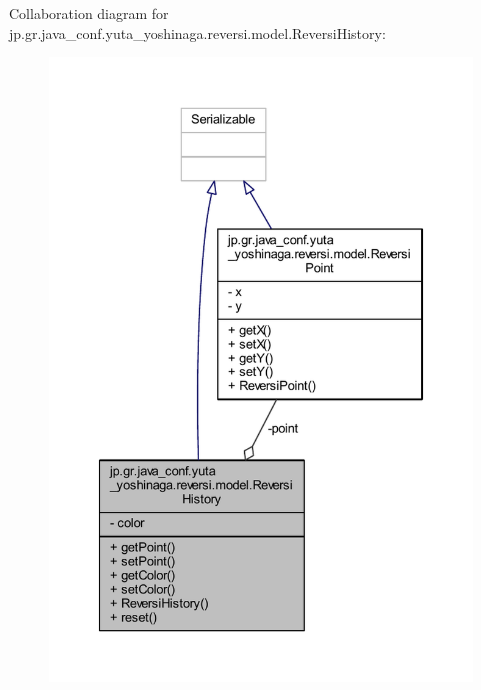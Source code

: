 Collaboration diagram for jp.\+gr.\+java\+\_\+conf.\+yuta\+\_\+yoshinaga.\+reversi.\+model.\+Reversi\+History\+:
\nopagebreak
\begin{figure}[H]
\begin{center}
\leavevmode
\includegraphics[width=334pt]{classjp_1_1gr_1_1java__conf_1_1yuta__yoshinaga_1_1reversi_1_1model_1_1_reversi_history__coll__graph}
\end{center}
\end{figure}
